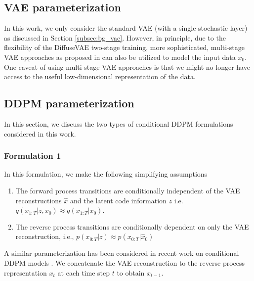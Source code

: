 \documentclass[10pt]{article} \usepackage[accepted]{tmlr}
\begin{document}
\subsection{VAE parameterization}

In this work, we only consider the standard VAE (with a single stochastic layer) as discussed in Section \ref{subsec:bg_vae}. However, in principle, due to the flexibility of the DiffuseVAE two-stage training, more sophisticated, multi-stage VAE approaches as proposed in \citep{razavi2019generating, child2021deep, vahdat2021nvae} can also be utilized to model the input data $x_0$. One caveat of using multi-stage VAE approaches is that we might no longer have access to the useful low-dimensional representation of the data.

\subsection{DDPM parameterization}

In this section, we discuss the two types of conditional DDPM formulations considered in this work.
\subsubsection{Formulation 1}
\label{subsec:form1}
In this formulation, we make the following simplifying assumptions
\begin{enumerate}
    \item The forward process transitions are conditionally independent of the VAE reconstructions $\hat{x}$ and the latent code information $z$ i.e. $q(x_{1:T}|z, x_0) \approx q(x_{1:T}|x_0)$.
    \item The reverse process transitions are conditionally dependent on only the VAE reconstruction, i.e., $p(x_{0:T}|z) \approx p(x_{0:T}|\hat{x}_0)$
\end{enumerate}
A similar parameterization has been considered in recent work on conditional DDPM models \citep{ho2021cascaded, saharia2021image}. We concatenate the VAE reconstruction to the reverse process representation $x_t$ at each time step $t$ to obtain $x_{t-1}$.
\end{document}
